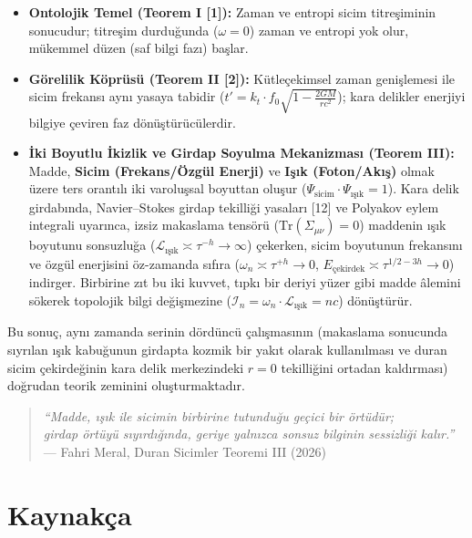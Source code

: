 \documentclass[12pt,a4paper]{article}
\begin{document}
\begin{itemize}
    \item \textbf{Ontolojik Temel (Teorem I [1]):} Zaman ve entropi sicim titreşiminin sonucudur; titreşim durduğunda ($\omega = 0$) zaman ve entropi yok olur, mükemmel düzen (saf bilgi fazı) başlar.
    \item \textbf{Görelilik Köprüsü (Teorem II [2]):} Kütleçekimsel zaman genişlemesi ile sicim frekansı aynı yasaya tabidir ($t' = k_t \cdot f_0 \sqrt{1 - \frac{2GM}{rc^2}}$); kara delikler enerjiyi bilgiye çeviren faz dönüştürücülerdir.
    \item \textbf{İki Boyutlu İkizlik ve Girdap Soyulma Mekanizması (Teorem III):} Madde, \textbf{Sicim (Frekans/Özgül Enerji)} ve \textbf{Işık (Foton/Akış)} olmak üzere ters orantılı iki varoluşsal boyuttan oluşur ($\Psi_{\text{sicim}} \cdot \Psi_{\text{ışık}} = 1$). Kara delik girdabında, Navier--Stokes girdap tekilliği yasaları [12] ve Polyakov eylem integrali uyarınca, izsiz makaslama tensörü ($\text{Tr}(\Sigma_{\mu\nu})=0$) maddenin ışık boyutunu sonsuzluğa ($\mathcal{L}_{\text{ışık}} \asymp \tau^{-h} \to \infty$) çekerken, sicim boyutunun frekansını ve özgül enerjisini öz-zamanda sıfıra ($\omega_n \asymp \tau^{+h} \to 0$, $E_{\text{çekirdek}} \asymp \tau^{1/2-3h} \to 0$) indirger. Birbirine zıt bu iki kuvvet, tıpkı bir deriyi yüzer gibi madde âlemini sökerek topolojik bilgi değişmezine ($\mathcal{I}_n = \omega_n \cdot \mathcal{L}_{\text{ışık}} = n c$) dönüştürür.
\end{itemize}

Bu sonuç, aynı zamanda serinin dördüncü çalışmasının (makaslama sonucunda sıyrılan ışık kabuğunun girdapta kozmik bir yakıt olarak kullanılması ve duran sicim çekirdeğinin kara delik merkezindeki $r=0$ tekilliğini ortadan kaldırması) doğrudan teorik zeminini oluşturmaktadır.

\begin{quote}
\textit{``Madde, ışık ile sicimin birbirine tutunduğu geçici bir örtüdür;\\
girdap örtüyü sıyırdığında, geriye yalnızca sonsuz bilginin sessizliği kalır.''}\\
— Fahri Meral, Duran Sicimler Teoremi III (2026)
\end{quote}

\section*{Kaynakça}
\end{document}
